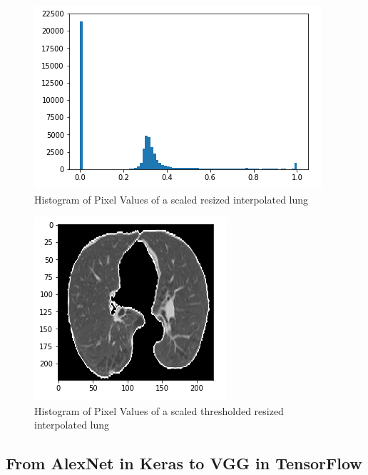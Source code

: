 \documentclass[twocolumn,10pt]{article}
\begin{document}
\begin{figure}[h!]
  \includegraphics[width=\columnwidth]{img/scaled_histogram.png}
  \caption{Histogram of Pixel Values of a scaled resized interpolated lung}
\end{figure}

\begin{figure}[h!]
  \includegraphics[width=\columnwidth]{img/threshold_image.png}
  \caption{Histogram of Pixel Values of a scaled thresholded resized interpolated lung}
\end{figure}

\subsection{From AlexNet in Keras to VGG in TensorFlow}
\end{document}
